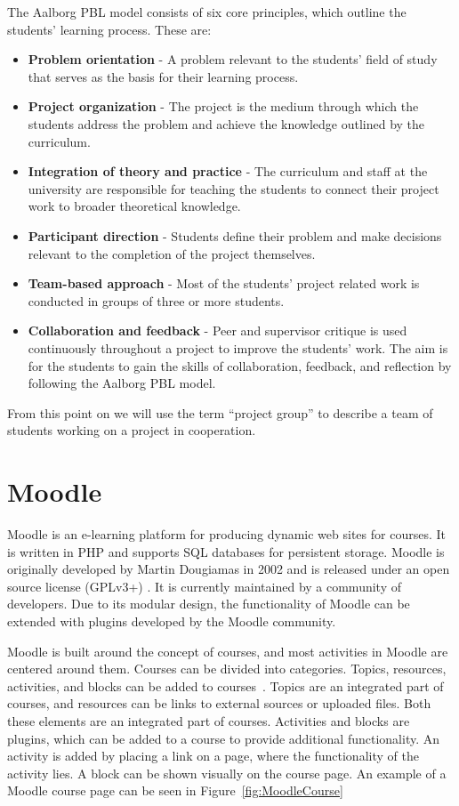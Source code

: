 The Aalborg PBL model consists of six core principles, which outline the students' learning process. 
These are:
\begin{itemize}
	\item \textbf{Problem orientation} - A problem relevant to the students' field of study that serves as the basis for their learning process.
	\item \textbf{Project organization} - The project is the medium through which the students address the problem and achieve the knowledge outlined by the curriculum.
	\item \textbf{Integration of theory and practice} - The curriculum and staff at the university are responsible for teaching the students to connect their project work to broader theoretical knowledge.
	\item \textbf{Participant direction} - Students define their problem and make decisions relevant to the completion of the project themselves.
	\item \textbf{Team-based approach} - Most of the students' project related work is conducted in groups of three or more students.
	\item \textbf{Collaboration and feedback} - Peer and supervisor critique is used continuously throughout a project to improve the students' work.
	The aim is for the students to gain the skills of collaboration, feedback, and reflection by following the Aalborg PBL model. 
\end{itemize}
From this point on we will use the term ``project group'' to describe a team of students working on a project in cooperation.


\section{Moodle}
Moodle is an e-learning platform for producing dynamic web sites for courses. 
It is written in PHP and supports SQL databases for persistent storage.
Moodle is originally developed by Martin Dougiamas in 2002 and is released under an open source license (GPLv3+) \citep{gpl}\cite{moodlelicense}. 
It is currently maintained by a community of developers. 
Due to its modular design, the functionality of Moodle can be extended with plugins developed by the Moodle community.

Moodle is built around the concept of courses, and most activities in Moodle are centered around them. 
Courses can be divided into categories.
Topics, resources, activities, and blocks can be added to courses~\citep{moodleStructural}.
Topics are an integrated part of courses, and resources can be links to external sources or uploaded files. 
Both these elements are an integrated part of courses. 
Activities and blocks are plugins, which can be added to a course to provide additional functionality. 
An activity is added by placing a link on a page, where the functionality of the activity lies. 
A block can be shown visually on the course page.
An example of a Moodle course page can be seen in Figure~\ref{fig:MoodleCourse}

